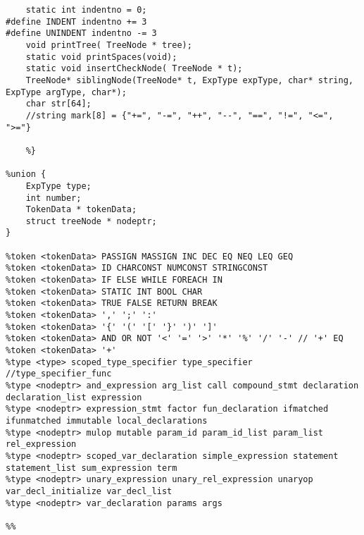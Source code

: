 \documentclass[12pt]{book}
\begin{document}
\begin{lstlisting}
    static int indentno = 0;
#define INDENT indentno += 3
#define UNINDENT indentno -= 3
    void printTree( TreeNode * tree);
    static void printSpaces(void);
    static void insertCheckNode( TreeNode * t);
    TreeNode* siblingNode(TreeNode* t, ExpType expType, char* string, ExpType argType, char*);
    char str[64];
    //string mark[8] = {"+=", "-=", "++", "--", "==", "!=", "<=", ">="}

    %} 

%union {
    ExpType type;    
    int number;
    TokenData * tokenData;
    struct treeNode * nodeptr;
}

%token <tokenData> PASSIGN MASSIGN INC DEC EQ NEQ LEQ GEQ 
%token <tokenData> ID CHARCONST NUMCONST STRINGCONST
%token <tokenData> IF ELSE WHILE FOREACH IN
%token <tokenData> STATIC INT BOOL CHAR   
%token <tokenData> TRUE FALSE RETURN BREAK 
%token <tokenData> ',' ';' ':'
%token <tokenData> '{' '(' '[' '}' ')' ']'
%token <tokenData> AND OR NOT '<' '=' '>' '*' '%' '/' '-' // '+' EQ
%token <tokenData> '+' 
%type <type> scoped_type_specifier type_specifier //type_specifier_func
%type <nodeptr> and_expression arg_list call compound_stmt declaration declaration_list expression 
%type <nodeptr> expression_stmt factor fun_declaration ifmatched ifunmatched immutable local_declarations
%type <nodeptr> mulop mutable param_id param_id_list param_list rel_expression                            
%type <nodeptr> scoped_var_declaration simple_expression statement statement_list sum_expression term         
%type <nodeptr> unary_expression unary_rel_expression unaryop var_decl_initialize var_decl_list 
%type <nodeptr> var_declaration params args  
    
%%


\end{lstlisting}
\end{document}

